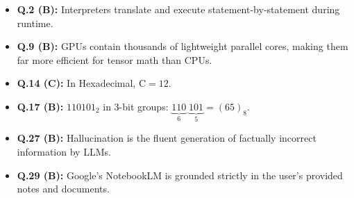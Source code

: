 \begin{expbox}
\begin{itemize}[leftmargin=5mm]
    \item \textbf{Q.2 (B):} Interpreters translate and execute statement-by-statement during runtime.
    \item \textbf{Q.9 (B):} GPUs contain thousands of lightweight parallel cores, making them far more efficient for tensor math than CPUs.
    \item \textbf{Q.14 (C):} In Hexadecimal, $\text{C} = 12$.
    \item \textbf{Q.17 (B):} $110101_2$ in 3-bit groups: $\underbrace{110}_{6}\;\underbrace{101}_{5} = (65)_8$.
    \item \textbf{Q.27 (B):} Hallucination is the fluent generation of factually incorrect information by LLMs.
    \item \textbf{Q.29 (B):} Google's NotebookLM is grounded strictly in the user's provided notes and documents.
\end{itemize}
\end{expbox}

\newpage
